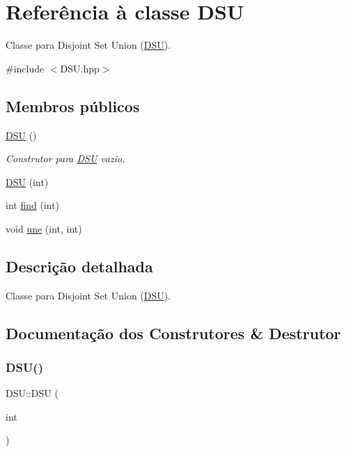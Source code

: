 \hypertarget{classDSU}{}\section{Referência à classe D\+SU}
\label{classDSU}


Classe para Disjoint Set Union (\mbox{\hyperlink{classDSU}{D\+SU}}).  




{\ttfamily \#include $<$D\+S\+U.\+hpp$>$}

\subsection*{Membros públicos}
\begin{DoxyCompactItemize}
\item 
\mbox{\label{classDSU_a537ec9947d526dd1ac2acc3bfe1bf8b3}} 
\mbox{\hyperlink{classDSU_a537ec9947d526dd1ac2acc3bfe1bf8b3}{D\+SU}} ()
\begin{DoxyCompactList}\small\item\em Construtor para \mbox{\hyperlink{classDSU}{D\+SU}} vazio. \end{DoxyCompactList}\item 
\mbox{\hyperlink{classDSU_ab4ea0f237eac81455e80443b3c060b40}{D\+SU}} (int)
\item 
int \mbox{\hyperlink{classDSU_a3915dd627bd9cd0abc6f83e154944961}{find}} (int)
\item 
void \mbox{\hyperlink{classDSU_a69728d8ed8c2262f76320ca7238e2f1f}{une}} (int, int)
\end{DoxyCompactItemize}


\subsection{Descrição detalhada}
Classe para Disjoint Set Union (\mbox{\hyperlink{classDSU}{D\+SU}}). 

\subsection{Documentação dos Construtores \& Destrutor}
\mbox{\label{classDSU_ab4ea0f237eac81455e80443b3c060b40}} 
\subsubsection{\texorpdfstring{DSU()}{DSU()}}
{\footnotesize\ttfamily D\+S\+U\+::\+D\+SU (\begin{DoxyParamCaption}\item[{int}]{ }\end{DoxyParamCaption})}

